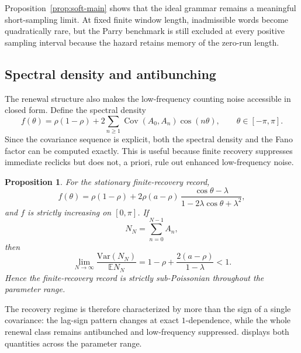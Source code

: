 \documentclass[11pt]{article}
\newtheorem{proposition}[theorem]{Proposition}
\theoremstyle{definition}
\newcommand{\EE}{\mathbb{E}}
\newcommand{\Var}{\mathrm{Var}}
\begin{document}
Proposition~\ref{prop:soft-main} shows that the ideal grammar remains a meaningful short-sampling limit. At fixed finite window length, inadmissible words become quadratically rare, but the Parry benchmark is still excluded at every positive sampling interval because the hazard retains memory of the zero-run length.

\subsection{Spectral density and antibunching}

The renewal structure also makes the low-frequency counting noise accessible in closed form. Define the spectral density
\[
f(\theta)=\rho(1-\rho)+2\sum_{n\ge1}\operatorname{Cov}(A_0,A_n)\cos(n\theta),
\qquad \theta\in[-\pi,\pi].
\]
Since the covariance sequence is explicit, both the spectral density and the Fano factor can be computed exactly. This is useful because finite recovery suppresses immediate reclicks but does not, a priori, rule out enhanced low-frequency noise.

\begin{proposition}\label{prop:spectrum-main}
For the stationary finite-recovery record,
\begin{equation}\label{eq:spectrum-main}
f(\theta)=
\rho(1-\rho)
+
2\rho(a-\rho)\,
\frac{\cos\theta-\lambda}{1-2\lambda\cos\theta+\lambda^2},
\end{equation}
and $f$ is strictly increasing on $[0,\pi]$. If
\[
N_N=\sum_{n=0}^{N-1}A_n,
\]
then
\begin{equation}\label{eq:fano-main}
\lim_{N\to\infty}\frac{\Var(N_N)}{\EE N_N}
=
1-\rho+\frac{2(a-\rho)}{1-\lambda}
<1.
\end{equation}
Hence the finite-recovery record is strictly sub-Poissonian throughout the parameter range.
\end{proposition}

The recovery regime is therefore characterized by more than the sign of a single covariance: the lag-sign pattern changes at exact $1$-dependence, while the whole renewal class remains antibunched and low-frequency suppressed.  displays both quantities across the parameter range.
\end{document}
